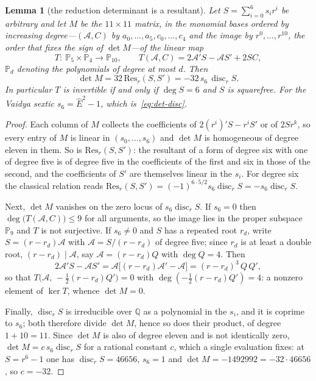 \documentclass[12pt]{iopart}
\newcommand{\Ehat}{\hat E}
\theoremstyle{plain}
\theoremstyle{definition}
\theoremstyle{plain}
\newtheorem{auxlemma}{Lemma}
\theoremstyle{remark}
\begin{document}
\begin{auxlemma}[the reduction determinant is a resultant]\label{lem:det-res}
Let $S=\sum_{i=0}^{6}s_ir^i$ be arbitrary and let $M$ be the $11\times11$ matrix, in the
monomial bases ordered by increasing degree---$(\mathcal A,C)$ by $a_0,\dots,a_5,c_0,\dots,c_4$
and the image by $r^0,\dots,r^{10}$, the order that fixes the sign of $\det M$---of the
linear map
\[
   T:\ \mathbb{P}_5\times\mathbb{P}_4\longrightarrow\mathbb{P}_{10},
   \qquad
   T(\mathcal{A},C)=2\mathcal{A}'S-\mathcal{A}S'+2SC ,
\]
$\mathbb{P}_d$ denoting the polynomials of degree at most $d$. Then
\begin{equation}
   \det M=32\,\mathrm{Res}_r(S,S')=-32\,s_6\,\operatorname{disc}_rS .
   \label{eq:det-res}
\end{equation}
In particular $T$ is invertible if and only if $\deg S=6$ and $S$ is squarefree. For the
Vaidya sextic $s_6=\Ehat^2-1$, which is~\eqref{eq:det-disc}.
\end{auxlemma}

\begin{proof}
Each column of $M$ collects the coefficients of $2(r^i)'S-r^iS'$ or of $2Sr^k$, so every
entry of $M$ is linear in $(s_0,\dots,s_6)$ and $\det M$ is homogeneous of degree eleven in
them. So is $\mathrm{Res}_r(S,S')$: the resultant of a form of degree six with one of
degree five is of degree five in the coefficients of the first and six in those of the
second, and the coefficients of $S'$ are themselves linear in the $s_i$. For degree six the
classical relation reads $\mathrm{Res}_r(S,S')=(-1)^{6\cdot5/2}s_6\operatorname{disc}_rS
=-s_6\operatorname{disc}_rS$.

Next, $\det M$ vanishes on the zero locus of $s_6\operatorname{disc}_rS$. If $s_6=0$ then
$\deg\big(T(\mathcal{A},C)\big)\le9$ for all arguments, so the image lies in the proper
subspace $\mathbb{P}_9$ and $T$ is not surjective. If $s_6\neq0$ and $S$ has a repeated
root $r_d$, write $S=(r-r_d)\mathcal{A}$ with $\mathcal{A}=S/(r-r_d)$ of degree five; since
$r_d$ is at least a double root, $(r-r_d)\mid\mathcal{A}$, say $\mathcal{A}=(r-r_d)Q$ with
$\deg Q=4$. Then
\[
   2\mathcal{A}'S-\mathcal{A}S'
   =\mathcal{A}\big[(r-r_d)\mathcal{A}'-\mathcal{A}\big]
   =(r-r_d)^3\,Q\,Q' ,
\]
so that $T\big(\mathcal{A},\,-\tfrac12(r-r_d)Q'\big)=0$ with $\deg(-\tfrac12(r-r_d)Q')=4$:
a nonzero element of $\ker T$, whence $\det M=0$.

Finally, $\operatorname{disc}_rS$ is irreducible over $\mathbb{Q}$ as a polynomial in the
$s_i$, and it is coprime to $s_6$; both therefore divide $\det M$, hence so does their
product, of degree $1+10=11$. Since $\det M$ is also of degree eleven and is not
identically zero, $\det M=c\,s_6\operatorname{disc}_rS$ for a rational constant $c$, which
a single evaluation fixes: at $S=r^6-1$ one has $\operatorname{disc}_rS=46656$, $s_6=1$
and $\det M=-1492992=-32\cdot46656$, so $c=-32$.
\end{proof}
\end{document}
